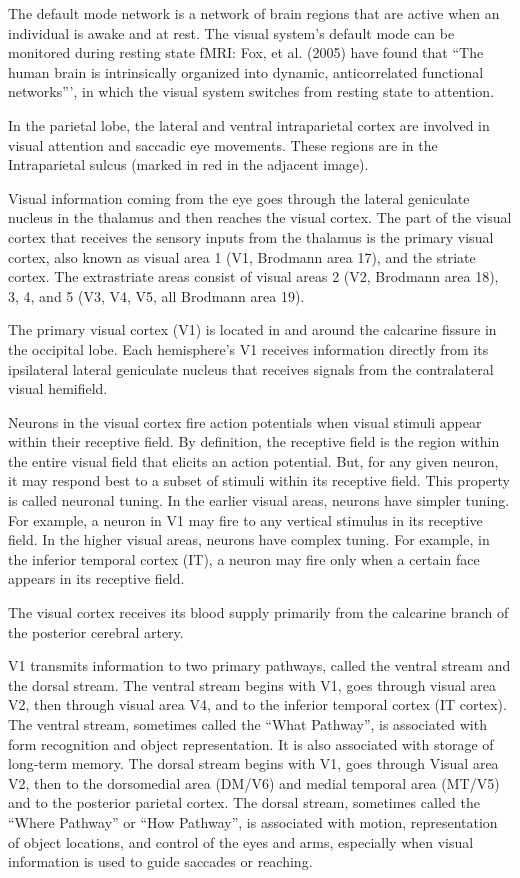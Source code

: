 \documentclass[]{book}
\begin{document}
The default mode network is a network of brain regions that are active when an individual is awake and at rest. The visual system's default mode can be monitored during resting state fMRI: Fox, et al. (2005) have found that ``The human brain is intrinsically organized into dynamic, anticorrelated functional networks''', in which the visual system switches from resting state to attention.

In the parietal lobe, the lateral and ventral intraparietal cortex are involved in visual attention and saccadic eye movements. These regions are in the Intraparietal sulcus (marked in red in the adjacent image).

Visual information coming from the eye goes through the lateral geniculate nucleus in the thalamus and then reaches the visual cortex. The part of the visual cortex that receives the sensory inputs from the thalamus is the primary visual cortex, also known as visual area 1 (V1, Brodmann area 17), and the striate cortex. The extrastriate areas consist of visual areas 2 (V2, Brodmann area 18), 3, 4, and 5 (V3, V4, V5, all Brodmann area 19).

The primary visual cortex (V1) is located in and around the calcarine fissure in the occipital lobe. Each hemisphere's V1 receives information directly from its ipsilateral lateral geniculate nucleus that receives signals from the contralateral visual hemifield.

Neurons in the visual cortex fire action potentials when visual stimuli appear within their receptive field. By definition, the receptive field is the region within the entire visual field that elicits an action potential. But, for any given neuron, it may respond best to a subset of stimuli within its receptive field. This property is called neuronal tuning. In the earlier visual areas, neurons have simpler tuning. For example, a neuron in V1 may fire to any vertical stimulus in its receptive field. In the higher visual areas, neurons have complex tuning. For example, in the inferior temporal cortex (IT), a neuron may fire only when a certain face appears in its receptive field.

The visual cortex receives its blood supply primarily from the calcarine branch of the posterior cerebral artery.

V1 transmits information to two primary pathways, called the ventral stream and the dorsal stream. The ventral stream begins with V1, goes through visual area V2, then through visual area V4, and to the inferior temporal cortex (IT cortex). The ventral stream, sometimes called the ``What Pathway'', is associated with form recognition and object representation. It is also associated with storage of long-term memory.
The dorsal stream begins with V1, goes through Visual area V2, then to the dorsomedial area (DM/V6) and medial temporal area (MT/V5) and to the posterior parietal cortex. The dorsal stream, sometimes called the ``Where Pathway'' or ``How Pathway'', is associated with motion, representation of object locations, and control of the eyes and arms, especially when visual information is used to guide saccades or reaching.
\end{document}
